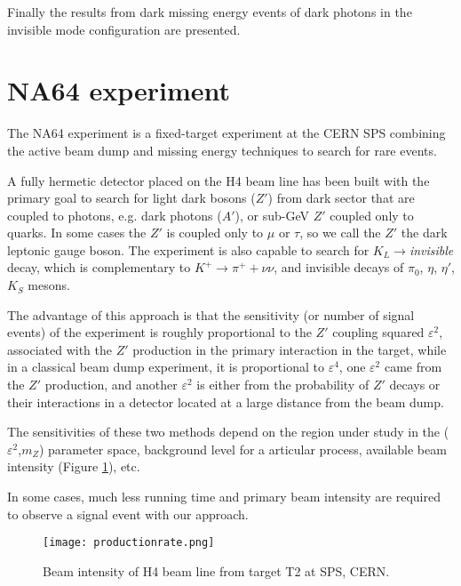 Finally the results from dark missing energy events of dark photons in the invisible mode configuration are presented. \par


\section{NA64 experiment}

The NA64 experiment is a fixed-target experiment at the CERN SPS combining the active beam dump and missing energy
techniques to search for rare events.\par

A fully hermetic detector placed on the H4 beam line has been built with the primary goal to search for light dark
bosons ($Z'$) from dark sector that are coupled to photons, e.g. dark photons ($A'$), or sub-GeV $Z'$ coupled only to
quarks. In some cases the $Z'$ is coupled only to $\mu$ or $\tau$, so we call the $Z'$ the dark leptonic gauge boson.
The experiment is also capable to search for $K_L \rightarrow ${\it invisible} decay, which is complementary to
$K^+\rightarrow \pi^+ + \nu \nu$, and invisible decays of $\pi_0$, $\eta$, $\eta'$, $K_S$ mesons.\par

The advantage of this approach is that the sensitivity (or number of signal events) of the experiment is roughly
proportional to the $Z'$ coupling squared $\varepsilon^2$, associated with the $Z'$ production in the primary interaction
in the target, while in a classical beam dump experiment, it is proportional to $\varepsilon^4$, one $\varepsilon^2$
came from the $Z'$ production, and another $\varepsilon^2$ is either from the probability of $Z'$ decays or their
interactions in a detector located at a large distance from the beam dump.\par

The sensitivities of these two methods depend on the region under study in the ($\varepsilon^2$,$m_Z$) parameter space,
background level for a articular process, available beam intensity (Figure \ref{fig:prodrate}), etc.\par

In some cases, much less running time and primary beam intensity are required to observe a signal event with our
approach.\par


\begin{figure}[ht]
	\hspace*{\fill}
	\centering
	\texttt{[image: productionrate.png]}
	\hspace*{\fill}
	\caption{Beam intensity of H4 beam line from target T2 at SPS, CERN.}
	\label{fig:prodrate}
\end{figure}

